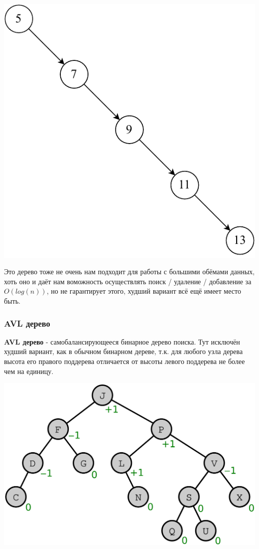 \documentclass[utf8,14pt,a4paper,oneside,russian]{book}
\begin{document}
	\begin{center}
		\includegraphics[scale=1]{unbalanced_bin_tree}\\
	\end{center}
	
	Это дерево тоже не очень нам подходит для работы с большими обёмами данных, хоть оно и даёт нам воможность осуществлять поиск / удаление / добавление за $O(log(n))$, но не гарантирует этого, худший вариант всё ещё имеет место быть.
	
	\subsubsection{AVL дерево}

	\textbf{AVL дерево} - самобалансирующееся бинарное дерево поиска. Тут исключён худший вариант, как в обычном бинарном дереве, т.к.  для любого узла дерева высота его правого поддерева отличается от высоты левого поддерева не более чем на единицу.
	
	\begin{center}
		\includegraphics[scale=0.5]{avl_tree}\\
	\end{center}
	
\end{document}
